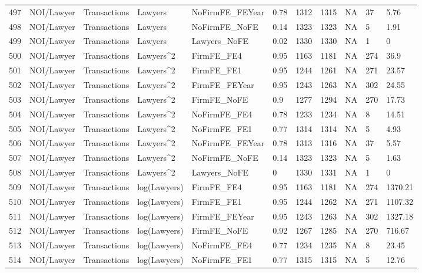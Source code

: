 \begin{table}[ht]
\begin{tabular}{rllllllllll}
  497 & NOI/Lawyer & Transactions & Lawyers & NoFirmFE\_FEYear & 0.78 & 1312 & 1315 & NA & 37 & 5.76 \\ 
  498 & NOI/Lawyer & Transactions & Lawyers & NoFirmFE\_NoFE & 0.14 & 1323 & 1323 & NA & 5 & 1.91 \\ 
  499 & NOI/Lawyer & Transactions & Lawyers & Lawyers\_NoFE & 0.02 & 1330 & 1330 & NA & 1 & 0 \\ 
  500 & NOI/Lawyer & Transactions & Lawyers^2 & FirmFE\_FE4 & 0.95 & 1163 & 1181 & NA & 274 & 36.9 \\ 
  501 & NOI/Lawyer & Transactions & Lawyers^2 & FirmFE\_FE1 & 0.95 & 1244 & 1261 & NA & 271 & 23.57 \\ 
  502 & NOI/Lawyer & Transactions & Lawyers^2 & FirmFE\_FEYear & 0.95 & 1243 & 1263 & NA & 302 & 24.55 \\ 
  503 & NOI/Lawyer & Transactions & Lawyers^2 & FirmFE\_NoFE & 0.9 & 1277 & 1294 & NA & 270 & 17.73 \\ 
  504 & NOI/Lawyer & Transactions & Lawyers^2 & NoFirmFE\_FE4 & 0.78 & 1233 & 1234 & NA & 8 & 14.51 \\ 
  505 & NOI/Lawyer & Transactions & Lawyers^2 & NoFirmFE\_FE1 & 0.77 & 1314 & 1314 & NA & 5 & 4.93 \\ 
  506 & NOI/Lawyer & Transactions & Lawyers^2 & NoFirmFE\_FEYear & 0.78 & 1313 & 1316 & NA & 37 & 5.57 \\ 
  507 & NOI/Lawyer & Transactions & Lawyers^2 & NoFirmFE\_NoFE & 0.14 & 1323 & 1323 & NA & 5 & 1.63 \\ 
  508 & NOI/Lawyer & Transactions & Lawyers^2 & Lawyers\_NoFE & 0 & 1330 & 1331 & NA & 1 & 0 \\ 
  509 & NOI/Lawyer & Transactions & log(Lawyers) & FirmFE\_FE4 & 0.95 & 1163 & 1181 & NA & 274 & 1370.21 \\ 
  510 & NOI/Lawyer & Transactions & log(Lawyers) & FirmFE\_FE1 & 0.95 & 1244 & 1262 & NA & 271 & 1107.32 \\ 
  511 & NOI/Lawyer & Transactions & log(Lawyers) & FirmFE\_FEYear & 0.95 & 1243 & 1263 & NA & 302 & 1327.18 \\ 
  512 & NOI/Lawyer & Transactions & log(Lawyers) & FirmFE\_NoFE & 0.92 & 1267 & 1285 & NA & 270 & 716.67 \\ 
  513 & NOI/Lawyer & Transactions & log(Lawyers) & NoFirmFE\_FE4 & 0.77 & 1234 & 1235 & NA & 8 & 23.45 \\ 
  514 & NOI/Lawyer & Transactions & log(Lawyers) & NoFirmFE\_FE1 & 0.77 & 1315 & 1315 & NA & 5 & 12.76 \\ 

\end{tabular}
\end{table}
